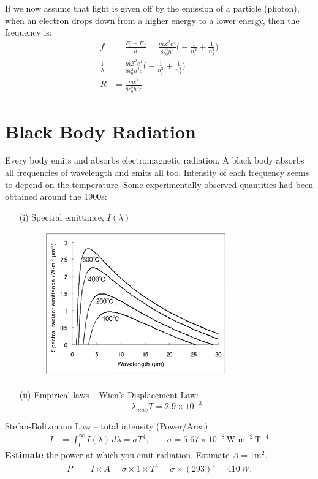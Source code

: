 \documentclass[a4paper, 11pt, normalem]{report}
\begin{document}
If we now assume that light is given off by the emission of a particle (photon), when an electron drops down from a higher energy to a lower energy, then the frequency is:
\begin{align}
    f &= \frac{E_{i} - E_{f}}{h} = \frac{mZ^{2}e^{4}}{8\epsilon_{0}^{2}h^{3}}\Big(-\frac{1}{n_{i}^{2}} + \frac{1}{n_{f}^{2}}\Big) \\
    \frac{1}{\lambda} &= \frac{mZ^{2}e^{4}}{8\epsilon_{0}^{2}h^{3}c}\Big(-\frac{1}{n_{i}^{2}} + \frac{1}{n_{f}^{2}}\Big) \\
    R &= \frac{me^{4}}{8\epsilon_{0}^{2}h^{3}c}
\end{align}

\section{Black Body Radiation}
Every body emits and absorbs electromagnetic radiation.
A black body absorbs all frequencies of wavelength and emits all too.
Intensity of each frequency seems to depend on the temperature.
Some experimentally observed quantities had been obtained around the 1900s:
\begin{itemize}
    \item[(i)] Spectral emittance, $I(\lambda)$
        \begin{figure}[H]
            \centering
            \includegraphics{SpectralEmit.jpg}
        \end{figure}
    \item[(ii)] Empirical laws -- Wien's Displacement Law:
        \begin{equation}
            \lambda_{max}T = 2.9\times10^{-3}
        \end{equation}
\end{itemize}
Stefan-Boltzmann Law -- total intensity (Power/Area)
\begin{align}
    I &= \int_{0}^{\infty} I(\lambda)\,d\lambda = \sigma T^{4},\qquad \sigma = 5.67\times10^{-8}\,\text{W m}^{-2}\,\text{T}^{-4}
\end{align}
\textbf{Estimate} the power at which you emit radiation.
Estimate $A = 1$m$^{2}$.
\begin{align}
    P &= I \times A = \sigma \times 1 \times T^{4} = \sigma \times (293)^{4} = 410\,W.
\end{align}
\end{document}
